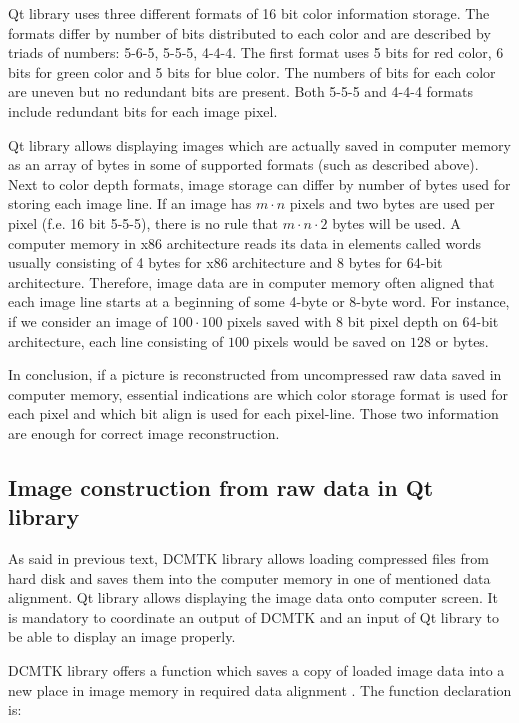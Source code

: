 Qt library uses three different formats of 16 bit color information storage. The formats differ by number of bits distributed to each color and are described by triads of numbers: 5-6-5, 5-5-5, 4-4-4. The first format uses 5 bits for red color, 6 bits for green color and 5 bits for blue color. The numbers of bits for each color are uneven but no redundant bits are present. Both 5-5-5 and 4-4-4 formats include redundant bits for each image pixel.

Qt library allows displaying images which are actually saved in computer memory as an array of bytes in some of supported formats (such as described above). Next to color depth formats, image storage can differ by number of bytes used for storing each image line. If an image has $m \cdot n$ pixels and two bytes are used per pixel (f.e. 16 bit 5-5-5), there is no rule that $m \cdot n \cdot 2$ bytes will be used. A computer memory in x86 architecture reads its data in elements called words usually consisting of 4 bytes for x86 architecture and 8 bytes for 64-bit architecture. Therefore, image data are in computer memory often aligned that each image line starts at a beginning of some 4-byte or 8-byte word\cite{nutshell}. For instance, if we consider an image of $100 \cdot 100$ pixels saved with 8 bit pixel depth on 64-bit architecture, each line consisting of $100$ pixels would be saved on $128$ or bytes.

In conclusion, if a picture is reconstructed from uncompressed raw data saved in computer memory, essential indications are which color storage format is used for each pixel and which bit align is used for each pixel-line. Those two information are enough for correct image reconstruction.

\subsection{Image construction from raw data in Qt library}
As said in previous text, DCMTK library allows loading compressed files from hard disk and saves them into the computer memory in one of mentioned data alignment. Qt library allows displaying the image data onto computer screen. It is mandatory to coordinate an output of DCMTK and an input of Qt library to be able to display an image properly.

DCMTK library offers a function which saves a copy of loaded image data into a new place in image memory in required data alignment \cite{dcmtksupport}. The function declaration is:

